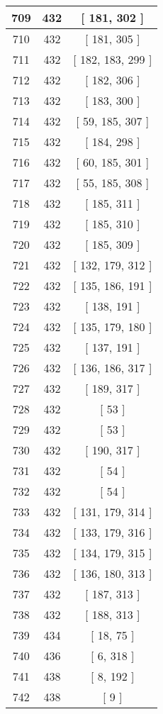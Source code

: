 \begin{center}
\begin{longtable}[H]{|| c c c ||}
\hline
709 & 432 & [ 181, 302 ] \\ 
\hline
710 & 432 & [ 181, 305 ] \\ 
\hline
711 & 432 & [ 182, 183, 299 ] \\ 
\hline
712 & 432 & [ 182, 306 ] \\ 
\hline
713 & 432 & [ 183, 300 ] \\ 
\hline
714 & 432 & [ 59, 185, 307 ] \\ 
\hline
715 & 432 & [ 184, 298 ] \\ 
\hline
716 & 432 & [ 60, 185, 301 ] \\ 
\hline
717 & 432 & [ 55, 185, 308 ] \\ 
\hline
718 & 432 & [ 185, 311 ] \\ 
\hline
719 & 432 & [ 185, 310 ] \\ 
\hline
720 & 432 & [ 185, 309 ] \\ 
\hline
721 & 432 & [ 132, 179, 312 ] \\ 
\hline
722 & 432 & [ 135, 186, 191 ] \\ 
\hline
723 & 432 & [ 138, 191 ] \\ 
\hline
724 & 432 & [ 135, 179, 180 ] \\ 
\hline
725 & 432 & [ 137, 191 ] \\ 
\hline
726 & 432 & [ 136, 186, 317 ] \\ 
\hline
727 & 432 & [ 189, 317 ] \\ 
\hline
728 & 432 & [ 53 ] \\ 
\hline
729 & 432 & [ 53 ] \\ 
\hline
730 & 432 & [ 190, 317 ] \\ 
\hline
731 & 432 & [ 54 ] \\ 
\hline
732 & 432 & [ 54 ] \\ 
\hline
733 & 432 & [ 131, 179, 314 ] \\ 
\hline
734 & 432 & [ 133, 179, 316 ] \\ 
\hline
735 & 432 & [ 134, 179, 315 ] \\ 
\hline
736 & 432 & [ 136, 180, 313 ] \\ 
\hline
737 & 432 & [ 187, 313 ] \\ 
\hline
738 & 432 & [ 188, 313 ] \\ 
\hline
739 & 434 & [ 18, 75 ] \\ 
\hline
740 & 436 & [ 6, 318 ] \\ 
\hline
741 & 438 & [ 8, 192 ] \\ 
\hline
742 & 438 & [ 9 ] \\ 

\end{longtable}
\end{center}
